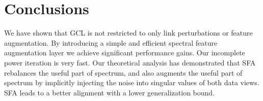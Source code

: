 \section{Conclusions}
We have shown that GCL is not restricted to only link perturbations or feature augmentation.
By introducing a simple and efficient spectral feature augmentation layer %
%
we achieve significant performance gains. 
Our incomplete power iteration is very fast. %
%
%
Our theoretical analysis has demonstrated that SFA rebalances the useful part of spectrum, and also augments the useful part of spectrum by implicitly injecting the noise into singular values of both data views. SFA leads to  a better alignment with a lower generalization bound. 
%
%
